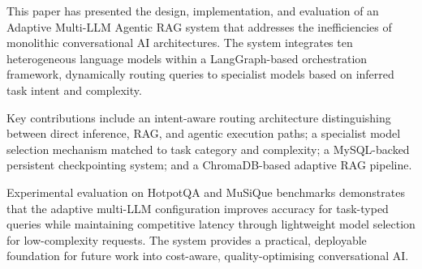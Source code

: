 \documentclass[12pt,a4paper]{article}
\begin{document}
This paper has presented the design, implementation, and evaluation of an Adaptive Multi-LLM Agentic RAG system that addresses the inefficiencies of monolithic conversational AI architectures. The system integrates ten heterogeneous language models within a LangGraph-based orchestration framework, dynamically routing queries to specialist models based on inferred task intent and complexity.

Key contributions include an intent-aware routing architecture distinguishing between direct inference, RAG, and agentic execution paths; a specialist model selection mechanism matched to task category and complexity; a MySQL-backed persistent checkpointing system; and a ChromaDB-based adaptive RAG pipeline.

Experimental evaluation on HotpotQA and MuSiQue benchmarks demonstrates that the adaptive multi-LLM configuration improves accuracy for task-typed queries while maintaining competitive latency through lightweight model selection for low-complexity requests. The system provides a practical, deployable foundation for future work into cost-aware, quality-optimising conversational AI.
\end{document}
